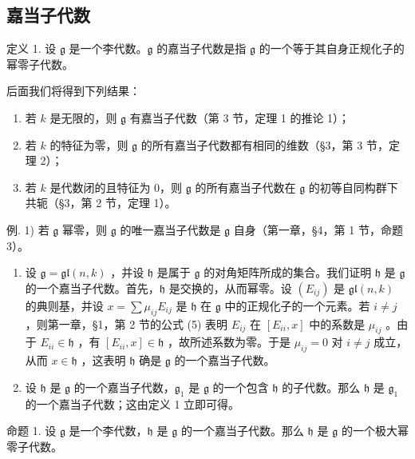 \subsection{嘉当子代数}

定义 1. 设 \(\mathfrak{g}\) 是一个李代数。\(\mathfrak{g}\) 的嘉当子代数是指 \(\mathfrak{g}\) 的一个等于其自身正规化子的幂零子代数。

后面我们将得到下列结果：

\begin{enumerate}
\def\labelenumi{\arabic{enumi})}
\item
  若 \(k\) 是无限的，则 \(\mathfrak{g}\) 有嘉当子代数（第 3 节，定理 1 的推论 1）；
\item
  若 \(k\) 的特征为零，则 \(\mathfrak{g}\) 的所有嘉当子代数都有相同的维数（§3，第 3 节，定理 2）；
\item
  若 \(k\) 是代数闭的且特征为 0，则 \(\mathfrak{g}\) 的所有嘉当子代数在 \(\mathfrak{g}\) 的初等自同构群下共轭（§3，第 2 节，定理 1）。
\end{enumerate}

例. 1) 若 \(\mathfrak{g}\) 幂零，则 \(\mathfrak{g}\) 的唯一嘉当子代数是 \(\mathfrak{g}\) 自身（第一章，§4，第 1 节，命题 3）。

\begin{enumerate}
\def\labelenumi{\arabic{enumi})}
\setcounter{enumi}{1}
\item
  设 \(\mathfrak{g} = \mathfrak{gl}(n,k)\) ，并设 \(\mathfrak{h}\) 是属于 \(\mathfrak{g}\) 的对角矩阵所成的集合。我们证明 \(\mathfrak{h}\) 是 \(\mathfrak{g}\) 的一个嘉当子代数。首先，\(\mathfrak{h}\) 是交换的，从而幂零。设 \((E_{ij})\) 是 \(\mathfrak{gl}(n,k)\) 的典则基，并设 \(x = \sum \mu_{ij}E_{ij}\) 是 \(\mathfrak{h}\) 在 \(\mathfrak{g}\) 中的正规化子的一个元素。若 \(i\neq j\) ，则第一章，§1，第 2 节的公式 (5) 表明 \(E_{ij}\) 在 \([E_{ii},x]\) 中的系数是 \(\mu_{ij}\) 。由于 \(E_{ii}\in \mathfrak{h}\) ，有 \([E_{ii},x]\in \mathfrak{h}\) ，故所述系数为零。于是 \(\mu_{ij} = 0\) 对 \(i\neq j\) 成立，从而 \(x\in \mathfrak{h}\) ，这表明 \(\mathfrak{h}\) 确是 \(\mathfrak{g}\) 的一个嘉当子代数。
\item
  设 \(\mathfrak{h}\) 是 \(\mathfrak{g}\) 的一个嘉当子代数，\(\mathfrak{g}_1\) 是 \(\mathfrak{g}\) 的一个包含 \(\mathfrak{h}\) 的子代数。那么 \(\mathfrak{h}\) 是 \(\mathfrak{g}_1\) 的一个嘉当子代数；这由定义 1 立即可得。
\end{enumerate}

命题 1. 设 \(\mathfrak{g}\) 是一个李代数，\(\mathfrak{h}\) 是 \(\mathfrak{g}\) 的一个嘉当子代数。那么 \(\mathfrak{h}\) 是 \(\mathfrak{g}\) 的一个极大幂零子代数。

